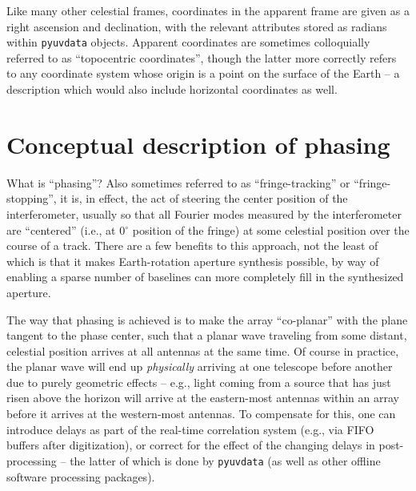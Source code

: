 \documentclass[11pt, oneside]{article}
\begin{document}
Like many other celestial frames, coordinates in the apparent frame are given as a right ascension and declination, with the relevant attributes stored as radians within \texttt{pyuvdata} objects. Apparent coordinates are sometimes colloquially referred to as ``topocentric coordinates'', though the latter more correctly refers to any coordinate system whose origin is a point on the surface of the Earth -- a description which would also include horizontal coordinates as well. 

\section{Conceptual description of phasing}\label{sec:concepts}
What is ``phasing''? Also sometimes referred to as ``fringe-tracking'' or ``fringe-stopping'', it is, in effect, the act of steering the center position of the interferometer, usually so that all Fourier modes measured by the interferometer are ``centered'' (i.e., at 0$^{\circ}$ position of the fringe) at some celestial position over the course of a track. There are a few benefits to this approach, not the least of which is that it makes Earth-rotation aperture synthesis possible, by way of enabling a sparse number of baselines can more completely fill in the synthesized aperture.

The way that phasing is achieved is to make the array ``co-planar'' with the plane tangent to the phase center, such that a planar wave traveling from some distant, celestial position arrives at all antennas at the same time. Of course in practice, the planar wave will end up \emph{physically} arriving at one telescope before another due to purely geometric effects -- e.g., light coming from a source that has just risen above the horizon will arrive at the eastern-most antennas within an array before it arrives at the western-most antennas. To compensate for this, one can introduce delays as part of the real-time correlation system (e.g., via FIFO buffers after digitization), or correct for the effect of the changing delays in post-processing -- the latter of which is done by \texttt{pyuvdata} (as well as other offline software processing packages).
\end{document}
